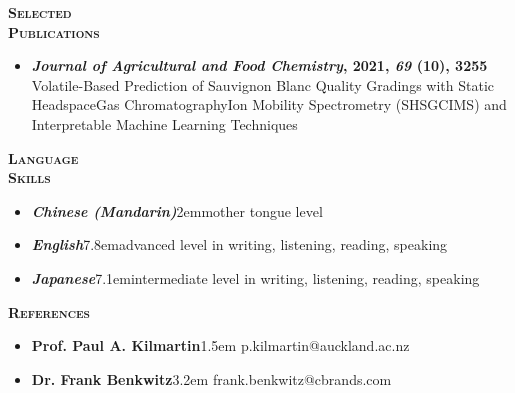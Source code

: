 \documentclass[11pt, a4paper, twoside]{article}
\begin{document}
\vspace{6ex}
\begin{minipage}[t]{0.15\textwidth}
\textsc{\textbf{\Large Selected\\Publications}}
  \end{minipage}\hfill
  \begin{minipage}[t]{0.8\textwidth}
    \begin{itemize}[leftmargin=*]
        \setlength\itemsep{-0.5ex}
        \item {\large\bf\textit{Journal of Agricultural and Food Chemistry}, \textbf{2021}, \textit{69}\kern2pt (10), 3255}\\\vspace{-3pt}
        {\small Volatile-Based Prediction of Sauvignon Blanc Quality Gradings with Static Headspace\textendash Gas Chromatography\textendash Ion Mobility Spectrometry (SHS\textendash GC\textendash IMS) and Interpretable Machine Learning Techniques}
    \end{itemize}
\end{minipage}\par
\vspace{6ex}
\begin{minipage}[t]{0.15\textwidth}
\textsc{\textbf{\Large Language\\\vspace{2.5pt}Skills}}
  \end{minipage}\hfill
  \begin{minipage}[t]{0.8\textwidth}
    \begin{itemize}[leftmargin=*]
    \setlength\itemsep{-0.5ex}
    \item {\large \textbf{\itshape Chinese (Mandarin)}}\kern2em{\small mother tongue level}
   \item {\large \textbf{\itshape English}}\kern7.8em{\small advanced level in writing, listening, reading, speaking}
   \item {\large \textbf{\itshape Japanese}}\kern7.1em{\small intermediate level in writing, listening, reading, speaking}
   \end{itemize}
\end{minipage}\par
\vspace{6ex}
\begin{minipage}[t]{0.15\textwidth}
\textsc{\textbf{\Large References}}
  \end{minipage}\hfill
  \begin{minipage}[t]{0.8\textwidth}
  \begin{itemize}[leftmargin=*]
      \setlength\itemsep{-0.2ex}
      \item {\large \textbf{Prof. Paul A. Kilmartin}}\kern1.5em p.kilmartin@auckland.ac.nz
      \item {\large \textbf{Dr. Frank Benkwitz}}\kern3.2em frank.benkwitz@cbrands.com
  \end{itemize}
\end{minipage}\par
\end{document}
